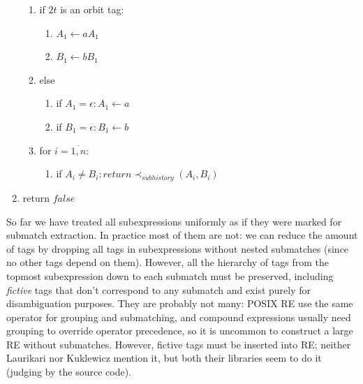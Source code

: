 \documentclass{article}
\newcommand{\Xset}{\!\leftarrow\!}
\newcommand{\Xeq}{\!=\!}
\theoremstyle{definition}
\begin{document}
\begin{multicols}{2}
\begin{enumerate}[leftmargin=0in]
\begin{enumerate}
            \item[] if $2t$ is an orbit tag:
            \begin{enumerate}
                \item[] $A_1 \Xset a A_1$
                \item[] $B_1 \Xset b B_1$
            \end{enumerate}
            \item[] else
            \begin{enumerate}
                \item[] if $A_1 \Xeq \epsilon: A_1 \Xset a$
                \item[] if $B_1 \Xeq \epsilon: B_1 \Xset b$
            \end{enumerate}

            \item[] for $i \Xeq \overline{1, n}$:
            \begin{enumerate}
                \item[] if $A_i \!\neq\! B_i: return \prec_{subhistory} (A_i, B_i)$
            \end{enumerate}

        \end{enumerate}
        \item[] return $false$
        \\
    \end{enumerate}

    \bigskip

So far we have treated all subexpressions uniformly as if they were marked for submatch extraction.
In practice most of them are not: we can reduce the amount of tags by dropping all tags in subexpressions without nested submatches
(since no other tags depend on them).
However, all the hierarchy of tags from the topmost subexpression down to each submatch must be preserved,
including \emph{fictive} tags that don't correspond to any submatch and exist purely for disambiguation purposes.
They are probably not many: POSIX RE use the same operator for grouping and submatching,
and compound expressions usually need grouping to override operator precedence,
so it is uncommon to construct a large RE without submatches.
However, fictive tags must be inserted into RE; neither Laurikari nor Kuklewicz mention it,
but both their libraries seem to do it (judging by the source code).
\\


\end{multicols}
\end{document}
